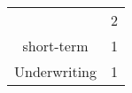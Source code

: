 \documentclass[]{book}
\theoremstyle{definition}
\theoremstyle{definition}
\theoremstyle{definition}
\theoremstyle{remark}
\begin{document}
\begin{longtable}[]{@{}cc@{}}
\begin{minipage}[t]{0.43\columnwidth}
\end{minipage} & \begin{minipage}[t]{0.05\columnwidth}\centering\strut
2\strut
\end{minipage}\tabularnewline
\begin{minipage}[t]{0.43\columnwidth}\centering\strut
short-term\strut
\end{minipage} & \begin{minipage}[t]{0.05\columnwidth}\centering\strut
1\strut
\end{minipage}\tabularnewline
\begin{minipage}[t]{0.43\columnwidth}\centering\strut
Underwriting\strut
\end{minipage} & \begin{minipage}[t]{0.05\columnwidth}\centering\strut
1\strut
\end{minipage}\tabularnewline
\bottomrule
\end{longtable}


\end{document}
